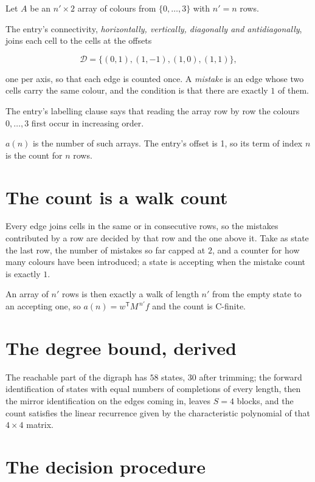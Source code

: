 \documentclass[11pt]{article}
\theoremstyle{definition}
\begin{document}
Let $A$ be an $n' \times 2$ array of colours from $\{0,\dots,3\}$ with $n' = n$ rows.

The entry's connectivity, {\itshape horizontally, vertically, diagonally and antidiagonally}, joins each cell to the cells at the offsets

\[\mathcal{D} = \{(0,1), (1,-1), (1,0), (1,1)\},\]

one per axis, so that each edge is counted once. A {\itshape mistake} is an edge whose two cells carry the same colour, and the condition is that there are exactly $1$ of them.

The entry's labelling clause says that reading the array row by row the colours $0,\dots,3$ first occur in increasing order.

$a(n)$ is the number of such arrays. The entry's offset is 1, so its term of index $n$ is the count for $n$ rows.

\section{The count is a walk count}

Every edge joins cells in the same or in consecutive rows, so the mistakes contributed by a row are decided by that row and the one above it. Take as state the last row, the number of mistakes so far capped at $2$, and a counter for how many colours have been introduced; a state is accepting when the mistake count is exactly $1$.

An array of $n'$ rows is then exactly a walk of length $n'$ from the empty state to an accepting one, so $a(n) = w^{\mathsf T}M^{\,n'}f$ and the count is C-finite.

\section{The degree bound, derived}

The reachable part of the digraph has $58$ states, $30$ after trimming; the forward identification of states with equal numbers of completions of every length, then the mirror identification on the edges coming in, leaves $S = 4$ blocks, and the count satisfies the linear recurrence given by the characteristic polynomial of that $4\times4$ matrix.

\section{The decision procedure}
\end{document}
